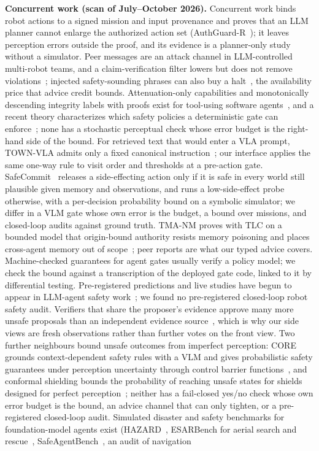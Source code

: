 \documentclass[conference]{IEEEtran}
\begin{document}
\textbf{Concurrent work (scan of July--October 2026).} Concurrent work binds robot actions to a signed mission and input provenance and proves that an LLM planner cannot enlarge the authorized action set (AuthGuard-R~\cite{chepuri2026authguardr}); it leaves perception errors outside the proof, and its evidence is a planner-only study without a simulator. Peer messages are an attack channel in LLM-controlled multi-robot teams, and a claim-verification filter lowers but does not remove violations~\cite{huang2026coordination}; injected safety-sounding phrases can also buy a halt~\cite{steinberg2026semanticdos}, the availability price that advice credit bounds. Attenuation-only capabilities and monotonically descending integrity labels with proofs exist for tool-using software agents~\cite{trantruong2026delegateguard,kravchenko2026appa,palumbo2026formalpolicy}, and a recent theory characterizes which safety policies a deterministic gate can enforce~\cite{ray2026whatenforced}; none has a stochastic perceptual check whose error budget is the right-hand side of the bound. For retrieved text that would enter a VLA prompt, TOWN-VLA admits only a fixed canonical instruction~\cite{zhou2026townvla}; our interface applies the same one-way rule to visit order and thresholds at a pre-action gate. SafeCommit~\cite{akewar2026safecommit} releases a side-effecting action only if it is safe in every world still plausible given memory and observations, and runs a low-side-effect probe otherwise, with a per-decision probability bound on a symbolic simulator; we differ in a VLM gate whose own error is the budget, a bound over missions, and closed-loop audits against ground truth. TMA-NM proves with TLC on a bounded model that origin-bound authority resists memory poisoning and places cross-agent memory out of scope~\cite{louck2026tma}; peer reports are what our typed advice covers. Machine-checked guarantees for agent gates usually verify a policy model; we check the bound against a transcription of the deployed gate code, linked to it by differential testing. Pre-registered predictions and live studies have begun to appear in LLM-agent safety work~\cite{williams2026simulatingdeployment,zheng2026commitgates}; we found no pre-registered closed-loop robot safety audit. Verifiers that share the proposer's evidence approve many more unsafe proposals than an independent evidence source~\cite{zheng2026commitgates}, which is why our side views are fresh observations rather than further votes on the front view. Two further neighbours bound unsafe outcomes from imperfect perception: CORE grounds context-dependent safety rules with a VLM and gives probabilistic safety guarantees under perception uncertainty through control barrier functions~\cite{ravichandran2026core}, and conformal shielding bounds the probability of reaching unsafe states for shields designed for perfect perception~\cite{scarbro2025conformalshield}; neither has a fail-closed yes/no check whose own error budget is the bound, an advice channel that can only tighten, or a pre-registered closed-loop audit. Simulated disaster and safety benchmarks for foundation-model agents exist (HAZARD~\cite{zhou2024hazard}, ESARBench for aerial search and rescue~\cite{zhang2026esarbench}, SafeAgentBench~\cite{yin2024safeagentbench}, an audit of navigation 
\end{document}
